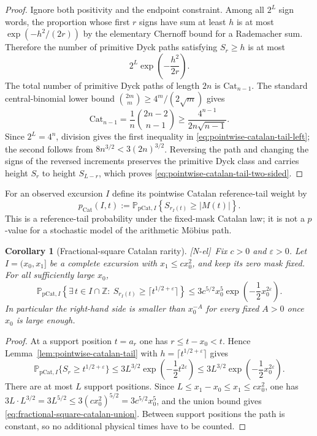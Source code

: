\documentclass[11pt]{amsart}
\numberwithin{equation}{section}
\theoremstyle{plain}
\newtheorem{corollary}[theorem]{Corollary}
\theoremstyle{definition}
\theoremstyle{remark}
\newcommand{\eps}{\varepsilon}
\newcommand{\tagNE}{\textup{[N-el]}}
\begin{document}
\begin{proof}
Ignore both positivity and the endpoint constraint.  Among all $2^L$ sign
words, the proportion whose first $r$ signs have sum at least $h$ is at most
$\exp(-h^2/(2r))$ by the elementary Chernoff bound for a Rademacher sum.
Therefore the number of primitive Dyck paths satisfying $S_r\ge h$ is at
most
\[
 2^L\exp\!\left(-\frac{h^2}{2r}\right).
\]
The total number of primitive Dyck paths of length $2n$ is $\mathrm{Cat}_{n-1}$.  The
standard central-binomial lower bound
$\binom{2m}{m}\ge4^m/(2\sqrt m)$ gives
\[
 \mathrm{Cat}_{n-1}=\frac1n\binom{2n-2}{n-1}
 \ge\frac{4^{n-1}}{2n\sqrt{n-1}}.
\]
Since $2^L=4^n$, division gives the first inequality in
\eqref{eq:pointwise-catalan-tail-left}; the second follows from
$8n^{3/2}<3(2n)^{3/2}$.  Reversing the path and changing the signs of the
reversed increments preserves the primitive Dyck class and carries height
$S_r$ to height $S_{L-r}$, which proves
\eqref{eq:pointwise-catalan-tail-two-sided}.
\end{proof}

For an observed excursion $I$ define its pointwise Catalan reference-tail weight
by
\begin{equation}
\label{eq:pointwise-catalan-pvalue}
 p_{\mathrm{Cat}}(I,t):=
 \mathbb P_{\mathrm{pCat},I}
 \left\{S_{r_I(t)}\ge |M(t)|\right\}.
\end{equation}
This is a reference-tail probability under the fixed-mask Catalan law; it is
not a $p$-value for a stochastic model of the arithmetic M\"obius path.

\begin{corollary}[Fractional-square Catalan rarity]
\label{cor:fractional-square-catalan-rarity}
\tagNE\ Fix $c>0$ and $\eps>0$.  Let $I=(x_0,x_1]$ be a complete excursion with
$x_1\le cx_0^2$, and keep its zero mask fixed.  For all sufficiently large
$x_0$,
\begin{equation}
\label{eq:fractional-square-catalan-union}
 \mathbb P_{\mathrm{pCat},I}
 \left\{\exists\,t\in I\cap\mathbb Z:\ S_{r_I(t)}\ge \lceil t^{1/2+\eps}\rceil\right\}
 \le 3c^{5/2}x_0^5
 \exp\!\left(-\frac12x_0^{2\eps}\right).
\end{equation}
In particular the right-hand side is smaller than $x_0^{-A}$ for every
fixed $A>0$ once $x_0$ is large enough.
\end{corollary}

\begin{proof}
At a support position $t=a_r$ one has $r\le t-x_0<t$.  Hence
Lemma~\ref{lem:pointwise-catalan-tail} with $h=\lceil t^{1/2+\eps}\rceil$ gives
\[
 \mathbb P_{\mathrm{pCat},I}\{S_r\ge t^{1/2+\eps}\}
 \le3L^{3/2}\exp\!\left(-\frac12t^{2\eps}\right)
 \le3L^{3/2}\exp\!\left(-\frac12x_0^{2\eps}\right).
\]
There are at most $L$ support positions.  Since
$L\le x_1-x_0\le x_1\le cx_0^2$, one has
$3L\cdot L^{3/2}=3L^{5/2}\le3(cx_0^2)^{5/2}=3c^{5/2}x_0^5$, and the union
bound gives
\eqref{eq:fractional-square-catalan-union}.  Between support positions the
path is constant, so no additional physical times have to be counted.
\end{proof}
\end{document}

